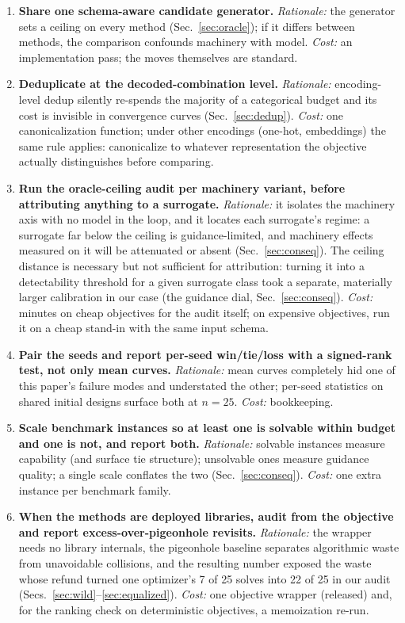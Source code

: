 \documentclass[%
 aip,
 amsmath,amssymb,
 floatfix,
 reprint,%
]{revtex4-1}
\begin{document}
\begin{enumerate}
  \item \textbf{Share one schema-aware candidate generator.}
  \emph{Rationale:} the generator sets a ceiling on every method
  (Sec.~\ref{sec:oracle}); if it differs between methods, the comparison
  confounds machinery with model. \emph{Cost:} an implementation pass;
  the moves themselves are standard.
  \item \textbf{Deduplicate at the decoded-combination level.}
  \emph{Rationale:} encoding-level dedup silently re-spends the majority
  of a categorical budget and its cost is invisible in convergence
  curves (Sec.~\ref{sec:dedup}). \emph{Cost:} one canonicalization
function; under other encodings (one-hot, embeddings) the same rule
applies: canonicalize to whatever representation the objective
actually distinguishes before comparing.
  \item \textbf{Run the oracle-ceiling audit per machinery variant,
  before attributing anything to a surrogate.} \emph{Rationale:} it
  isolates the machinery axis with no model in the loop, and it locates
  each surrogate's regime: a surrogate far below the ceiling is
  guidance-limited, and machinery effects measured on it will be
  attenuated or absent (Sec.~\ref{sec:conseq}). The ceiling distance is
  necessary but not sufficient for attribution: turning it into a
  detectability threshold for a given surrogate class took a separate,
  materially larger calibration in our case (the guidance dial,
  Sec.~\ref{sec:conseq}). \emph{Cost:} minutes on cheap objectives for
  the audit itself; on expensive objectives, run it on a cheap stand-in
  with the same input schema.
  \item \textbf{Pair the seeds and report per-seed win/tie/loss with a
  signed-rank test, not only mean curves.} \emph{Rationale:} mean curves
  completely hid one of this paper's failure modes and understated the
  other; per-seed statistics on shared initial designs surface both at
  $n{=}25$. \emph{Cost:} bookkeeping.
  \item \textbf{Scale benchmark instances so at least one is solvable
  within budget and one is not, and report both.} \emph{Rationale:}
  solvable instances measure capability (and surface tie structure);
  unsolvable ones measure guidance quality; a single scale conflates
  the two (Sec.~\ref{sec:conseq}). \emph{Cost:} one extra instance per
  benchmark family.
  \item \textbf{When the methods are deployed libraries, audit from the
  objective and report excess-over-pigeonhole revisits.}
  \emph{Rationale:} the wrapper needs no library internals, the
  pigeonhole baseline separates algorithmic waste from unavoidable
  collisions, and the resulting number exposed the waste whose refund
  turned one optimizer's 7 of 25 solves into 22 of 25 in our audit
  (Secs.~\ref{sec:wild}--\ref{sec:equalized}). \emph{Cost:} one
  objective wrapper (released) and, for the ranking check on
  deterministic objectives, a memoization re-run.
\end{enumerate}
\end{document}
